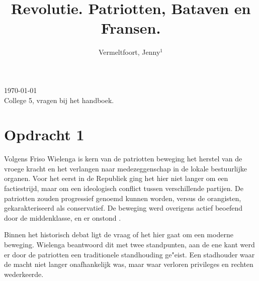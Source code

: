 \documentclass[11pt]{amsart}
\begin{document}
\setcounter{page}{1}

\hfill     {\small \today} \\
{\small College 5, vragen bij het handboek.}\hfill
{\small } %

\centerline{}

\centerline{}

\title[Bataafse Revolutie]{Revolutie. Patriotten, Bataven en Fransen.}

\author[J. Vermeltfoort]{Vermeltfoort, Jenny$^1$}

\address{$^{1}$ 3787494, Faculteit Geesteswetenschappen, Leiden
     Universiteit, Leiden, Nederland.}
\email{\textcolor[rgb]{0.00,0.00,0.84}{j.vermeltfoort@umail.leidenuniv.nl}}



\maketitle

\section*{Opdracht 1}
\label{opdracht1}
Volgens Friso Wielenga is kern van de patriotten beweging het herstel van de vroege kracht en het verlangen naar medezeggenschap in de lokale bestuurlijke organen. \autocite[178]{wielengaGeschiedenisVanNederland2022} Voor het eerst in de Republiek ging het hier niet langer om een factiestrijd, maar om een ideologisch conflict tussen verschillende partijen. \autocite[179]{wielengaGeschiedenisVanNederland2022} De patriotten zouden progressief genoemd kunnen worden, versus de orangisten, gekarakteriseerd als conservatief. De beweging werd overigens actief beoefend door de middenklasse, en er onstond . \autocite{wielengaGeschiedenisVanNederland2022}

Binnen het historisch debat ligt de vraag of het hier gaat om een moderne beweging. Wielenga beantwoord dit met twee standpunten, aan de ene kant werd er door de patriotten een traditionele standhouding ge"eist. \autocite[182]{wielengaGeschiedenisVanNederland2022} Een stadhouder waar de macht niet langer onafhankelijk was, maar waar verloren privileges en rechten wederkeerde. \autocite[182]{wielengaGeschiedenisVanNederland2022} 
\end{document}
